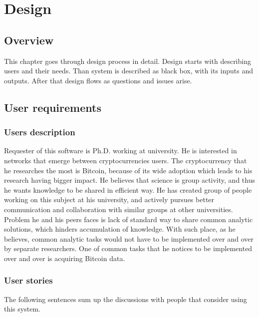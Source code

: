 \documentclass[12pt, en, eng, oneside]{mgr}
\begin{document}
\chapter{Design}

\section{Overview}
This chapter goes through design process in detail. Design starts with describing users and their needs. Than system is described as black box, with its inputs and outputs. After that design flows as questions and issues arise. 

\section{User requirements}

\subsection{Users description}

Requester of this software is Ph.D. working at university. He is interested in networks that emerge between cryptocurrencies users. The cryptocurrency that he researches the most is Bitcoin, because of its wide adoption which leads to his research having bigger impact. He believes that science is group activity, and thus he wants knowledge to be shared in efficient way. He has created group of people working on this subject at his university, and actively pursues better communication and collaboration with similar groups at other universities. Problem he and his peers faces is lack of standard way to share common analytic solutions, which hinders accumulation of knowledge. With such place, as he believes, common analytic tasks would not have to be implemented over and over by separate researchers. One of common tasks that he notices to be implemented over and over is acquiring Bitcoin data.  

\subsection{User stories}

The following sentences sum up the discussions with people that consider using this system.
\end{document}
